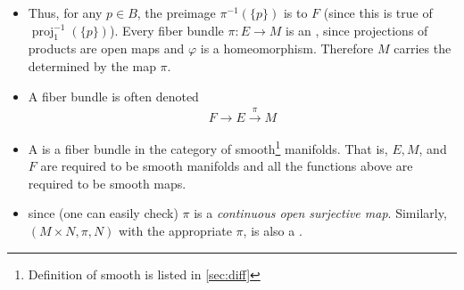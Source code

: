 \documentclass{article}
\begin{document}
\begin{enumerate}
\begin{itemize}
     \item Thus, for any $p \in B$, the preimage $\pi^{-1}(\{p\})$ is  to $F$ (since this is true of $\operatorname{proj}_{1}^{-1}(\{p\})$). Every fiber bundle $\pi: E \rightarrow M$ is an , since projections of products are open maps and $\varphi$ is a homeomorphism. Therefore $M$ carries the  determined by the map $\pi$.
     \item {}
A fiber bundle  is often denoted
\begin{align*}
F \longrightarrow E \stackrel{\pi}{\longrightarrow} M
\end{align*}
\item A  is a fiber bundle in the category of smooth\footnote{Definition of smooth is listed in \cref{sec:diff}} manifolds. That is, $E, M$, and $F$ are required to be smooth manifolds and all the functions above are required to be smooth maps. 

\item {} since (one can easily check) $\pi$ is a \emph{continuous open surjective map}. Similarly, $(M \times N, \pi, N)$ with the appropriate $\pi$, is also a .

\centerline{}


\end{itemize}
\end{enumerate}
\end{document}
